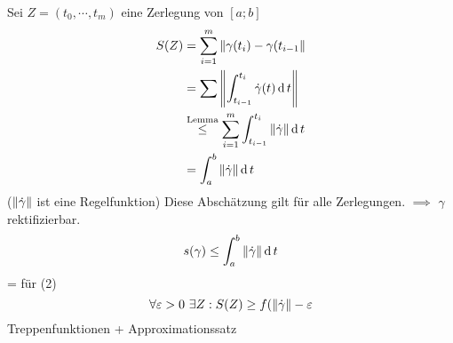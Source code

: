 \begin{Bew}
  Sei $Z=(t_0,\cdots,t_m)$ eine Zerlegung von $[a;b]$    
  \begin{align*}
    S(Z)&=\sum^m_{i=1}\left\| \gamma(t_i)-\gamma(t_{i-1} \right\|\\
    &=\sum\left\| \int^{t_i}_{t_{i-1}}\dot{\gamma}(t)\operatorname{d} t \right\|\\
    &\stackrel{\text{Lemma}}{\leq}\sum^m_{i=1}\int^{t_i}_{t_{i-1}}\left\| \dot{\gamma} \right\|\operatorname{d} t\\
    &=\int^b_a\left\| \dot{\gamma} \right\|\operatorname{d} t    
  \end{align*}
  ($\left\| \dot{\gamma} \right\|$ ist eine Regelfunktion) Diese Abschätzung gilt für alle Zerlegungen. $\implies$ $\gamma$ rektifizierbar.
  \[s(\gamma)\leq \int^b_a\left\| \dot{\gamma} \right\|\operatorname{d} t\]
  = für (2)
  \[\forall \varepsilon>0\ \exists Z: S(Z)\geq f(\left\| \dot{\gamma} \right\|-\varepsilon\]
  Treppenfunktionen + Approximationssatz
\end{Bew}

